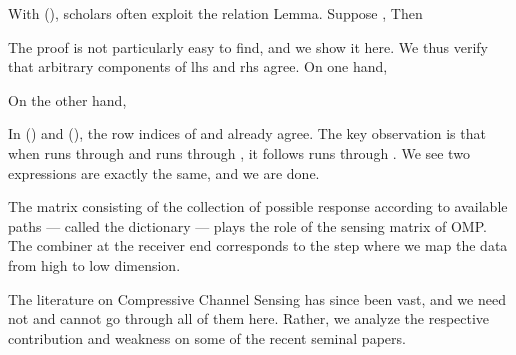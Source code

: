 With (), scholars often exploit the relation
\Result
{Lemma.}
{
Suppose ,
Then
}

The proof is not particularly easy to find, and we show it here.
We thus verify that arbitrary components of lhs and rhs agree.
On one hand,


On the other hand,


In () and (), the row indices of  and  already agree.
The key observation is that when  runs through  and  runs through , it follows  runs through .
We see two expressions are exactly the same, and we are done.

The matrix consisting of the collection of possible response according to available paths --- called the dictionary --- plays the role of the sensing matrix of OMP.
The combiner at the receiver end corresponds to the step where we map the data from high to low dimension.

\stopsection

\startsection [title={Further Development}]

The literature on Compressive Channel Sensing has since been vast, and we need not and cannot go through all of them here.
Rather, we analyze the respective contribution and weakness on some of the recent seminal papers.

